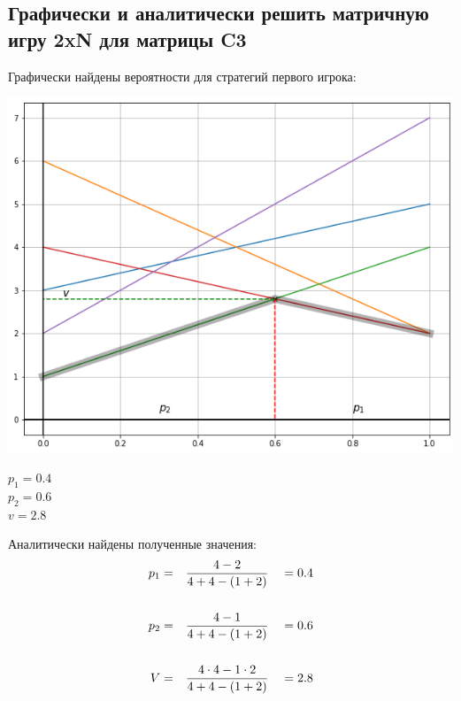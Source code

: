 \documentclass[12pt,a4paper]{article}%
\begin{document}
\subsection{Графически и аналитически решить матричную игру 2xN для матрицы C3}
Графически найдены вероятности для стратегий первого игрока:
\begin{center}
  \includegraphics[scale=0.5]{C3.png}
\end{center}
$p_1 = 0.4$\\$p_2 = 0.6$\\$v = 2.8$

Аналитически найдены полученные значения:
$$
\begin{aligned}
  p_1 &= && \frac{4 - 2}                {4 + 4 - (1 + 2)} && = 0.4\\ \vspace{0.5cm}\\
  p_2 &= && \frac{4 - 1}                {4 + 4 - (1 + 2)} && = 0.6\\ \vspace{0.5cm}\\
  V   &= && \frac{4 \cdot 4 - 1 \cdot 2}{4 + 4 - (1 + 2)} && = 2.8
\end{aligned}
$$
\end{document}
